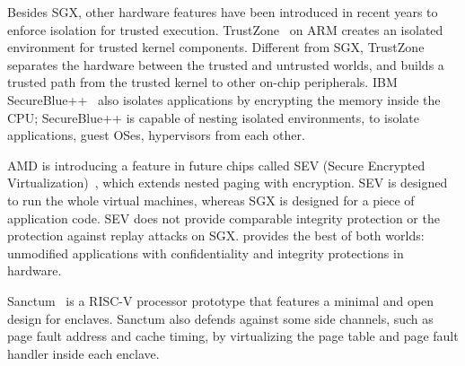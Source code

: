 Besides SGX, other hardware features have been introduced in recent years to enforce isolation for trusted execution.
TrustZone~\cite{arm-trustzone} on ARM
creates an isolated environment for trusted kernel components. 
Different from SGX, TrustZone separates the hardware between the trusted and untrusted worlds,
and builds a trusted path from the trusted kernel to other on-chip peripherals.
IBM SecureBlue++~\cite{secureblue++} also isolates applications by encrypting the memory inside the CPU; SecureBlue++ is capable of nesting isolated environments, to isolate applications, guest OSes, hypervisors from each other.



AMD is introducing a feature in future chips called SEV (Secure Encrypted Virtualization)~\cite{amd-sme},
which extends nested paging with encryption.
SEV is designed to run the whole virtual machines, whereas SGX is designed for 
a piece of application code.
SEV does not provide comparable integrity protection or the protection against replay attacks on SGX.
\graphenesgx{} provides the best of both worlds: unmodified applications with confidentiality and integrity protections in hardware.




Sanctum~\cite{costan2016sanctum} is a RISC-V processor prototype 
that features a 
minimal and open design for enclaves.
Sanctum also defends against some side channels, such as page fault address and cache timing, by virtualizing the page table and page fault handler inside each enclave.


